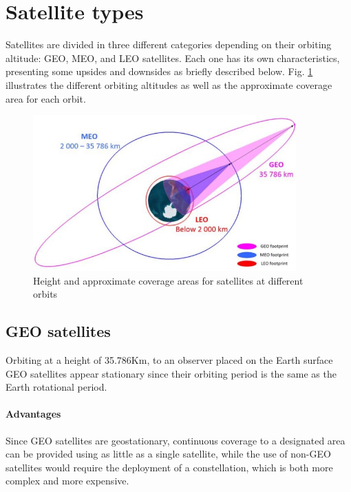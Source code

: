 \section{Satellite types}
\label{sec:satellite-types}
Satellites are divided in three different categories depending on their orbiting altitude: \ac{GEO}, \ac{MEO}, and \ac{LEO} satellites. Each one has its own characteristics, presenting some upsides and downsides as briefly described below. Fig. \ref{fig:satellite_coverages} illustrates the different orbiting altitudes as well as the approximate coverage area for each orbit.

\begin{figure}[ht]
    \centering
    \includegraphics[width=0.9\textwidth]{res/satellite-coverages.jpg}
    \caption{Height and approximate coverage areas for satellites at different orbits\cite{sustainable-sat-com-6g}}
    \label{fig:satellite_coverages}
\end{figure}

\subsection{GEO satellites}
Orbiting at a height of 35.786Km, to an observer placed on the Earth surface \ac{GEO} satellites appear stationary since their orbiting period is the same as the Earth rotational period.

\paragraph{Advantages}    
Since \ac{GEO} satellites are geostationary, continuous coverage to a designated area can be provided using as little as a single satellite, while the use of non-\ac{GEO} satellites would require the deployment of a constellation, which is both more complex and more expensive. 

